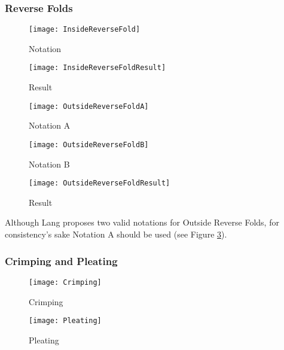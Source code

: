\subsubsection*{Reverse Folds}

\begin{figure*}[htbp]
	\centering
	\begin{subfigure}{0.4\textwidth}
		\texttt{[image: InsideReverseFold]}
		\caption{Notation}
		\label{fig:insideReverseFoldA}
	\end{subfigure}
	\begin{subfigure}{0.4\textwidth}
		\texttt{[image: InsideReverseFoldResult]}
		\caption{Result}
		\label{fig:insideReverseFoldResult}
	\end{subfigure}
	\caption{Inside Reverse Fold}
	\label{fig:insideReverseFold}
\end{figure*}
\begin{figure*}
	\begin{subfigure}{0.3\textwidth}
		\texttt{[image: OutsideReverseFoldA]}
		\caption{Notation A}
		\label{fig:outsideReverseFoldA}
	\end{subfigure}
	\begin{subfigure}{0.3\textwidth}
		\texttt{[image: OutsideReverseFoldB]}
		\caption{Notation B}
		\label{fig:outsideReverseFoldB}
	\end{subfigure}
	\begin{subfigure}{0.3\textwidth}
		\texttt{[image: OutsideReverseFoldResult]}
		\caption{Result}
		\label{fig:outsideReverseFoldResult}
	\end{subfigure}
	\caption{Outside Reverse Fold}
	\label{fig:outsideReverseFold}
\end{figure*}
\noindent Although Lang proposes two valid notations for Outside Reverse Folds, for consistency's sake Notation A should be used (see Figure \ref{fig:outsideReverseFoldA}).

\newpage
\subsubsection*{Crimping and Pleating}
\begin{figure*}[htbp]
	\centering
	\begin{subfigure}{0.49\textwidth}
		\texttt{[image: Crimping]}
		\caption{Crimping}
		\label{fig:crimping}
	\end{subfigure}
	\begin{subfigure}{0.49\textwidth}
		\texttt{[image: Pleating]}
		\caption{Pleating}
		\label{fig:pleating}
	\end{subfigure}
\end{figure*}

